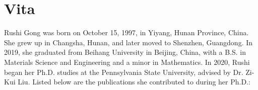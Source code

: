 \documentclass[letterpaper, 12pt]{report}
\begin{document}

\newpage
\setlength\parindent{2em} %













\printbibliography[
heading=bibintoc,
title={Bibliography}
]

\newpage
\chapter*{Vita}
\thispagestyle{empty}
\vspace{-6pt}

{\small
Rushi Gong was born on October 15, 1997, in Yiyang, Hunan Province, China. She grew up in Changsha, Hunan, and later moved to Shenzhen, Guangdong. In 2019, she graduated from Beihang University in Beijing, China, with a B.S. in Materials Science and Engineering and a minor in Mathematics. In 2020, Rushi began her Ph.D. studies at the Pennsylvania State University, advised by Dr. Zi-Kui Liu. Listed below are the publications she contributed to during her Ph.D.:
\fontsize{10}{10}\selectfont

}
\end{document}

